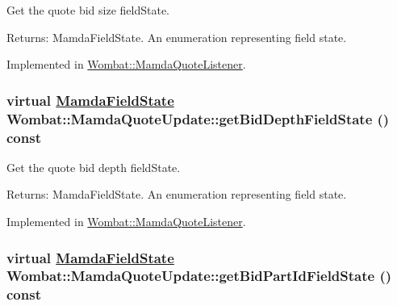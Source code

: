 Get the quote bid size field\-State. 

\begin{Desc}
\item[Returns:]Mamda\-Field\-State. An enumeration representing field state. \end{Desc}


Implemented in \hyperlink{classWombat_1_1MamdaQuoteListener_00ecbc2964d5439e77d04ffc2d00d9e9}{Wombat::Mamda\-Quote\-Listener}.\hypertarget{classWombat_1_1MamdaQuoteUpdate_b40779149909af89e8fb52ef50382826}{
\subsubsection[getBidDepthFieldState]{\setlength{\rightskip}{0pt plus 5cm}virtual \hyperlink{namespaceWombat_93aac974f2ab713554fd12a1fa3b7d2a}{Mamda\-Field\-State} Wombat::Mamda\-Quote\-Update::get\-Bid\-Depth\-Field\-State () const}}
\label{classWombat_1_1MamdaQuoteUpdate_b40779149909af89e8fb52ef50382826}


Get the quote bid depth field\-State. 

\begin{Desc}
\item[Returns:]Mamda\-Field\-State. An enumeration representing field state. \end{Desc}


Implemented in \hyperlink{classWombat_1_1MamdaQuoteListener_98c0e8e6190f6cb27684fd9abcf4a356}{Wombat::Mamda\-Quote\-Listener}.\hypertarget{classWombat_1_1MamdaQuoteUpdate_6fe2cb5a01e258527dc254719b392ec0}{
\subsubsection[getBidPartIdFieldState]{\setlength{\rightskip}{0pt plus 5cm}virtual \hyperlink{namespaceWombat_93aac974f2ab713554fd12a1fa3b7d2a}{Mamda\-Field\-State} Wombat::Mamda\-Quote\-Update::get\-Bid\-Part\-Id\-Field\-State () const}}
\label{classWombat_1_1MamdaQuoteUpdate_6fe2cb5a01e258527dc254719b392ec0}


